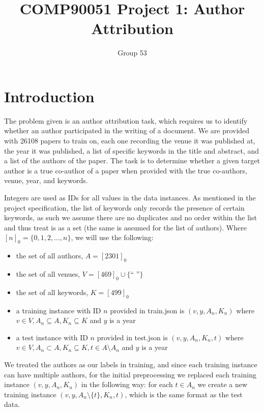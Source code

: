 \documentclass[11pt]{article}
\title{COMP90051 Project 1: Author Attribution}
\author{Group 53}
\begin{document}
\maketitle


\section{Introduction}

The problem given is an author attribution task, which requires us to identify whether an author participated in the writing of a document. We are provided with 26108 papers to train on, each one recording the venue it was published at, the year it was published, a list of specific keywords in the title and abstract, and a list of the authors of the paper. The task is to determine whether a given target author is a true co-author of a paper when provided with the true co-authors, venue, year, and keywords.


Integers are used as IDs for all values in the data instances. As mentioned in the project specification, the list of keywords only records the presence of certain keywords, as such we assume there are no duplicates and no order within the list and thus treat is as a set (the same is assumed for the list of authors). Where $[n]_0 = \{0, 1, 2, ..., n\}$, we will use the following:
\begin{itemize}
	\item the set of all authors, $A = [2301]_0$
	\item the set of all venues, $V = [469]_0 \cup \{\text{`` ''}\}$
	\item the set of all keywords, $K = [499]_0$
	\item a training instance with ID $n$ provided in train.json is $(v, y, A_n, K_n)$ where $v \in V, A_n \subseteq A, K_n \subseteq K$ and $y$ is a year
	\item a test instance with ID $n$ provided in test.json is $(v, y, A_n, K_n, t)$ where $v \in V, A_n \subset A, K_n \subseteq K, t \in A \setminus A_n$ and $y$ is a year
\end{itemize}


We treated the authors as our labels in training, and since each training instance can have multiple authors, for the initial preprocessing we replaced each training instance $(v, y, A_n, K_n)$ in the following way: for each $t \in A_n$ we create a new training instance $(v, y, A_n \setminus \{t\}, K_n, t)$, which is the same format as the test data.
\end{document}
